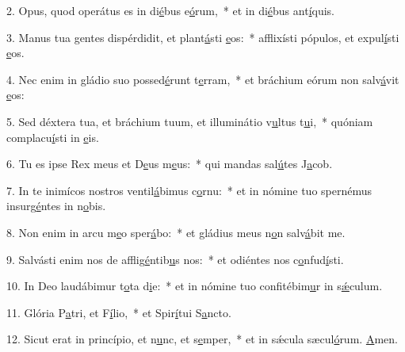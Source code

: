 2. Opus, quod operátus es in di\uline{é}bus e\uline{ó}rum,~* et in di\uline{é}bus ant\uline{í}quis.\par 
3. Manus tua gentes dispérdidit, et plant\uline{á}sti \uline{e}os:~* afflixísti pópulos, et expul\uline{í}sti \uline{e}os.\par 
4. Nec enim in gládio suo possed\uline{é}runt t\uline{e}rram,~* et bráchium eórum non salv\uline{á}vit \uline{e}os:\par 
5. Sed déxtera tua, et bráchium tuum, et illuminátio v\uline{u}ltus t\uline{u}i,~* quóniam complacu\uline{í}sti in \uline{e}is.\par 
6. Tu es ipse Rex meus et D\uline{e}us m\uline{e}us:~* qui mandas sal\uline{ú}tes J\uline{a}cob.\par 
7. In te inimícos nostros ventil\uline{á}bimus c\uline{o}rnu:~* et in nómine tuo spernémus insurg\uline{é}ntes in n\uline{o}bis.\par 
8. Non enim in arcu m\uline{e}o sper\uline{á}bo:~* et gládius meus n\uline{o}n salv\uline{á}bit me.\par 
9. Salvásti enim nos de afflig\uline{é}ntib\uline{u}s nos:~* et odiéntes nos c\uline{o}nfud\uline{í}sti.\par 
10. In Deo laudábimur t\uline{o}ta d\uline{i}e:~* et in nómine tuo confitébim\uline{u}r in s\uline{ǽ}culum.\par 
11. Glória P\uline{a}tri, et F\uline{í}lio,~* et Spir\uline{í}tui S\uline{a}ncto.\par 
12. Sicut erat in princípio, et n\uline{u}nc, et s\uline{e}mper,~* et in sǽcula sæcul\uline{ó}rum. \uline{A}men.\par 
